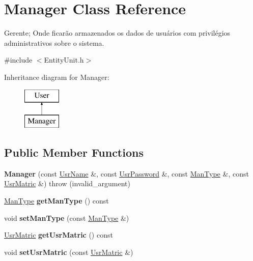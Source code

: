 \hypertarget{classManager}{\section{Manager Class Reference}
\label{classManager}
}


Gerente; Onde ficarão armazenados os dados de usuários com privilégios administrativos sobre o sistema.  




{\ttfamily \#include $<$Entity\-Unit.\-h$>$}

Inheritance diagram for Manager\-:\begin{figure}[H]
\begin{center}
\leavevmode
\includegraphics[height=2.000000cm]{classManager}
\end{center}
\end{figure}
\subsection*{Public Member Functions}
\begin{DoxyCompactItemize}
\item 
\hypertarget{classManager_ad2ee8089f5e80bc03fabcf9a493d045b}{{\bfseries Manager} (const \hyperlink{classUsrName}{Usr\-Name} \&, const \hyperlink{classUsrPassword}{Usr\-Password} \&, const \hyperlink{classUsrType}{Man\-Type} \&, const \hyperlink{classUsrMatric}{Usr\-Matric} \&)  throw (invalid\-\_\-argument)}\label{classManager_ad2ee8089f5e80bc03fabcf9a493d045b}

\item 
\hypertarget{classManager_a255ac6a7e2112631001296fa8db3811b}{\hyperlink{classUsrType}{Man\-Type} {\bfseries get\-Man\-Type} () const }\label{classManager_a255ac6a7e2112631001296fa8db3811b}

\item 
\hypertarget{classManager_a3d4e9cb6cc0e8d9be47fcc086b4e584e}{void {\bfseries set\-Man\-Type} (const \hyperlink{classUsrType}{Man\-Type} \&)}\label{classManager_a3d4e9cb6cc0e8d9be47fcc086b4e584e}

\item 
\hypertarget{classManager_a462f3704b016b57e087db417df73f07a}{\hyperlink{classUsrMatric}{Usr\-Matric} {\bfseries get\-Usr\-Matric} () const }\label{classManager_a462f3704b016b57e087db417df73f07a}

\item 
\hypertarget{classManager_a93309a0dde84dd0b5fe90d9e1da49822}{void {\bfseries set\-Usr\-Matric} (const \hyperlink{classUsrMatric}{Usr\-Matric} \&)}\label{classManager_a93309a0dde84dd0b5fe90d9e1da49822}

\end{DoxyCompactItemize}
